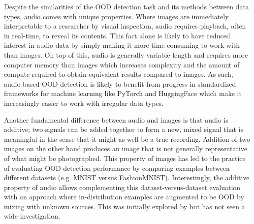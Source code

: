 Despite the similarities of the OOD detection task and its methods between data types, audio comes with unique properties. 
Where images are immediately interpretable to a researcher by visual inspection, audio requires playback, often in real-time, to reveal its contents. This fact alone is likely to have reduced interest in audio data by simply making it more time-consuming to work with than images. On top of this, audio is generally variable length and requires more computer memory than images which increases complexity and the amount of compute required to obtain equivalent results compared to images. 
As such, audio-based OOD detection is likely to benefit from progress in standardized frameworks for machine learning like PyTorch \parencite{paszke_automatic_2017} and HuggingFace \parencite{wolf_huggingface_2020,lhoest_datasets_2021} which make it increasingly easier to work with irregular data types. 

Another fundamental difference between audio and images is that audio is additive; two signals can be added together to form a new, mixed signal that is meaningful in the sense that it might as well be a true recording. 
Addition of two images on the other hand produces an image that is not generally representative of what might be photographed. 
This property of images has led to the practice of evaluating OOD detection performance by comparing examples between different datasets (e.g. MNIST versus FashionMNIST). 
Interestingly, the additive property of audio allows complementing this dataset-versus-dataset evaluation with an approach where in-distribution examples are augmented to be OOD by mixing with unknown sources. This was initially explored by \textcite{hendrycks_baseline_2017} but has not seen a wide investigation. 

